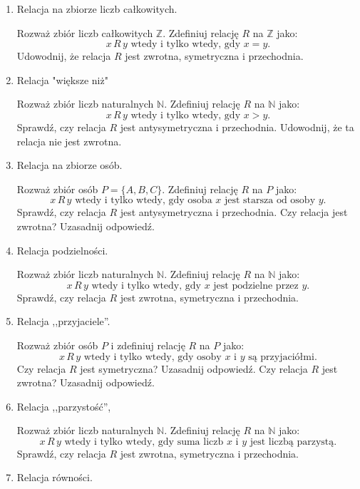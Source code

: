 \documentclass[12pt]{article}
\begin{document}
\begin{enumerate} 

\item 
Relacja na zbiorze liczb całkowitych.

Rozważ zbiór liczb całkowitych $\mathbb{Z}$. Zdefiniuj relację $R$ na $\mathbb{Z}$ jako: 
\[
x \, R \, y \text{ wtedy i tylko wtedy, gdy } x = y.
\]
Udowodnij, że relacja $R$ jest zwrotna, symetryczna i przechodnia.

\item 
 Relacja "większe niż"

Rozważ zbiór liczb naturalnych $ \mathbb{N} $. Zdefiniuj relację $ R $ na $ \mathbb{N} $ jako:
\[
x \, R \, y \text{ wtedy i tylko wtedy, gdy } x > y.
\]
Sprawdź, czy relacja $ R $ jest antysymetryczna i przechodnia.
Udowodnij, że ta relacja nie jest zwrotna.

\item
 Relacja na zbiorze osób.

Rozważ zbiór osób $ P = \{A, B, C\} $. Zdefiniuj relację $ R $ na $ P $ jako:
\[
x \, R \, y \text{ wtedy i tylko wtedy, gdy osoba } x \text{ jest starsza od osoby } y.
\]
Sprawdź, czy relacja $ R $ jest antysymetryczna i przechodnia.
Czy relacja jest zwrotna? Uzasadnij odpowiedź.

\item
 Relacja podzielności.

Rozważ zbiór liczb naturalnych $ \mathbb{N} $. Zdefiniuj relację $ R $ na $ \mathbb{N} $ jako:
\[
x \, R \, y \text{ wtedy i tylko wtedy, gdy } x \text{ jest podzielne przez } y.
\]
Sprawdź, czy relacja $ R $ jest zwrotna, symetryczna i przechodnia.

\item 
 Relacja ,,przyjaciele''.

Rozważ zbiór osób $ P $ i zdefiniuj relację $ R $ na $ P $ jako:
\[
x \, R \, y \text{ wtedy i tylko wtedy, gdy osoby } x \text{ i } y \text{ są przyjaciółmi}.
\]
 Czy relacja $ R $ jest symetryczna? Uzasadnij odpowiedź.
Czy relacja $ R $ jest zwrotna? Uzasadnij odpowiedź.

\item 
Relacja ,,parzystość'',

Rozważ zbiór liczb naturalnych $ \mathbb{N} $. Zdefiniuj relację $ R $ na $ \mathbb{N} $ jako:
\[
x \, R \, y \text{ wtedy i tylko wtedy, gdy suma liczb } x \text{ i } y \text{ jest liczbą parzystą.}
\]
Sprawdź, czy relacja $ R $ jest zwrotna, symetryczna i przechodnia.

\item 
 Relacja równości.


\end{enumerate}
\end{document}
